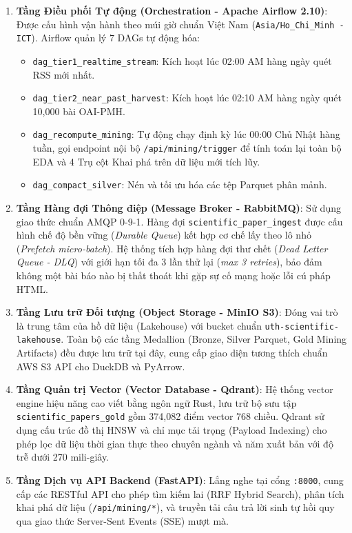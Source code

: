 \begin{enumerate}[label=\textbf{\arabic*.}]
  \item \textbf{Tầng Điều phối Tự động (Orchestration - Apache Airflow 2.10)}:
    Được cấu hình vận hành theo múi giờ chuẩn Việt Nam (\texttt{Asia/Ho\_Chi\_Minh - ICT}). Airflow quản lý 7 DAGs tự động hóa:
    \begin{itemize}
      \item \texttt{dag\_tier1\_realtime\_stream}: Kích hoạt lúc 02:00 AM hàng ngày quét RSS mới nhất.
      \item \texttt{dag\_tier2\_near\_past\_harvest}: Kích hoạt lúc 02:10 AM hàng ngày quét 10,000 bài OAI-PMH.
      \item \texttt{dag\_recompute\_mining}: Tự động chạy định kỳ lúc 00:00 Chủ Nhật hàng tuần, gọi endpoint nội bộ \texttt{/api/mining/trigger} để tính toán lại toàn bộ EDA và 4 Trụ cột Khai phá trên dữ liệu mới tích lũy.
      \item \texttt{dag\_compact\_silver}: Nén và tối ưu hóa các tệp Parquet phân mảnh.
    \end{itemize}
  \item \textbf{Tầng Hàng đợi Thông điệp (Message Broker - RabbitMQ)}:
    Sử dụng giao thức chuẩn AMQP 0-9-1. Hàng đợi \texttt{scientific\_paper\_ingest} được cấu hình chế độ bền vững (\textit{Durable Queue}) kết hợp cơ chế lấy theo lô nhỏ (\textit{Prefetch micro-batch}). Hệ thống tích hợp hàng đợi thư chết (\textit{Dead Letter Queue - DLQ}) với giới hạn tối đa 3 lần thử lại (\textit{max 3 retries}), bảo đảm không một bài báo nào bị thất thoát khi gặp sự cố mạng hoặc lỗi cú pháp HTML.
  \item \textbf{Tầng Lưu trữ Đối tượng (Object Storage - MinIO S3)}:
    Đóng vai trò là trung tâm của hồ dữ liệu (Lakehouse) với bucket chuẩn \texttt{uth-scientific-lakehouse}. Toàn bộ các tầng Medallion (Bronze, Silver Parquet, Gold Mining Artifacts) đều được lưu trữ tại đây, cung cấp giao diện tương thích chuẩn AWS S3 API cho DuckDB và PyArrow.
  \item \textbf{Tầng Quản trị Vector (Vector Database - Qdrant)}:
    Hệ thống vector engine hiệu năng cao viết bằng ngôn ngữ Rust, lưu trữ bộ sưu tập \texttt{scientific\_papers\_gold} gồm 374,082 điểm vector 768 chiều. Qdrant sử dụng cấu trúc đồ thị HNSW và chỉ mục tải trọng (Payload Indexing) cho phép lọc dữ liệu thời gian thực theo chuyên ngành và năm xuất bản với độ trễ dưới 270 mili-giây.
  \item \textbf{Tầng Dịch vụ API Backend (FastAPI)}:
    Lắng nghe tại cổng \texttt{:8000}, cung cấp các RESTful API cho phép tìm kiếm lai (RRF Hybrid Search), phân tích khai phá dữ liệu (\texttt{/api/mining/*}), và truyền tải câu trả lời sinh tự hồi quy qua giao thức Server-Sent Events (SSE) mượt mà.

\end{enumerate}
